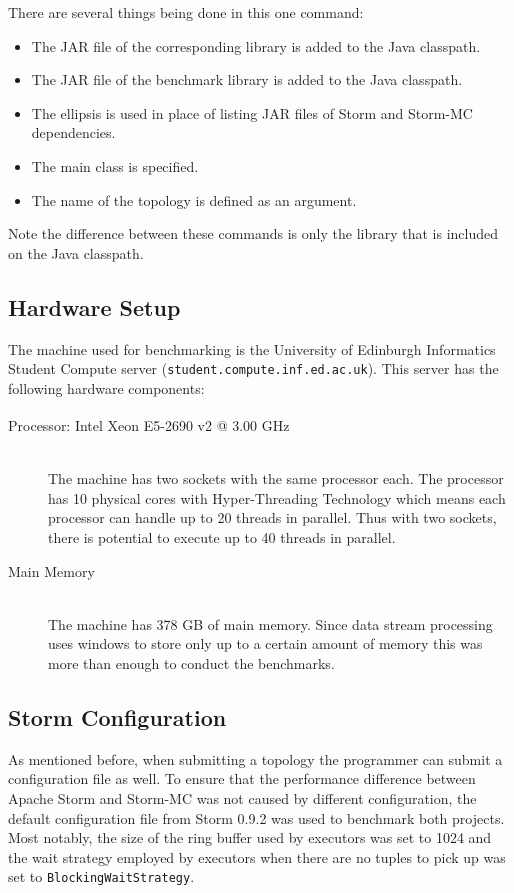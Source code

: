There are several things being done in this one command:

\begin{itemize}
	\item The JAR file of the corresponding library is added to the Java classpath.
	\item The JAR file of the benchmark library is added to the Java classpath.
	\item The ellipsis is used in place of listing JAR files of Storm and Storm-MC dependencies.
	\item The main class is specified.
	\item The name of the topology is defined as an argument.
\end{itemize}

Note the difference between these commands is only the library that is included on the Java classpath.

\subsection{Hardware Setup}

The machine used for benchmarking is the University of Edinburgh Informatics Student Compute server (\texttt{student.compute.inf.ed.ac.uk}). This server has the following hardware components:

\begin{description}
	\item[Processor: Intel\textsuperscript{\textregistered} Xeon\textsuperscript{\textregistered} E5-2690 v2 @ 3.00 GHz] \hfill \\
	The machine has two sockets with the same processor each. The processor has 10 physical cores with Hyper-Threading Technology which means each processor can handle up to 20 threads in parallel. Thus with two sockets, there is potential to execute up to 40 threads in parallel.
	\item[Main Memory] \hfill \\
	The machine has 378 GB of main memory. Since data stream processing uses windows to store only up to a certain amount of memory this was more than enough to conduct the benchmarks.
\end{description}

\subsection{Storm Configuration}

As mentioned before, when submitting a topology the programmer can submit a configuration file as well. To ensure that the performance difference between Apache Storm and Storm-MC was not caused by different configuration, the default configuration file from Storm 0.9.2 was used to benchmark both projects. Most notably, the size of the ring buffer used by executors was set to 1024 and the wait strategy employed by executors when there are no tuples to pick up was set to \texttt{BlockingWaitStrategy}.

